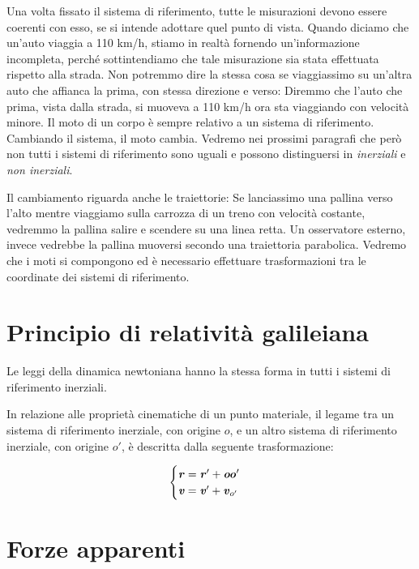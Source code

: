 Una volta fissato il sistema di riferimento, tutte le misurazioni devono
essere coerenti con esso, se si intende adottare quel punto di vista.
Quando diciamo che un'auto viaggia a 110 km/h, stiamo in realtà fornendo
un'informazione incompleta, perché sottintendiamo che tale misurazione
sia stata effettuata rispetto alla strada. Non potremmo dire la stessa
cosa se viaggiassimo su un'altra auto che affianca la prima, con stessa
direzione e verso: Diremmo che
l'auto che prima, vista dalla strada, si muoveva a 110 km/h ora sta viaggiando con velocità
minore. Il moto di un corpo è sempre relativo a un sistema di riferimento.
Cambiando il sistema, il moto cambia. Vedremo nei prossimi paragrafi
che però non tutti i sistemi di riferimento sono uguali e possono
distinguersi in \textit{inerziali} e \textit{non inerziali}.

Il cambiamento riguarda anche le traiettorie: Se lanciassimo una pallina
verso l'alto mentre viaggiamo sulla carrozza di un treno con velocità
costante, vedremmo la pallina salire e scendere su una linea retta.
Un osservatore esterno, invece vedrebbe la pallina muoversi secondo
una traiettoria parabolica. Vedremo che i moti si compongono
ed è necessario effettuare trasformazioni tra le coordinate dei
sistemi di riferimento.

\section{Principio di relatività galileiana}

\begin{tcolorbox}[colback = yellow!30, colframe = yellow!30!black, title = {Principio dei relatività galileiana}]
Le leggi della dinamica newtoniana hanno la stessa forma in tutti i
sistemi di riferimento inerziali.

In relazione alle proprietà cinematiche di un punto materiale, il legame
tra un sistema di riferimento inerziale, con origine $o$, e un altro
sistema di riferimento inerziale, con origine $o'$, è descritta dalla
seguente trasformazione:

\[
\begin{cases}
    \textbf{\textit{r}} = \textbf{\textit{r}}' + \textbf{\textit{oo}}'\\
    \textbf{\textit{v}} = \textbf{\textit{v}}' + \textbf{\textit{v}}_{o'}
\end{cases}
\]
\end{tcolorbox}


\section{Forze apparenti}


